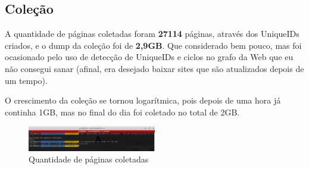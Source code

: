 \subsection{Coleção}

A quantidade de páginas coletadas foram \textbf{27114} páginas, através dos UniqueIDs criados, e o dump da coleção foi de \textbf{2,9GB}. Que considerado bem pouco, mas foi ocasionado pelo uso de detecção de UniqueIDs e ciclos no grafo da Web que eu não consegui sanar (afinal, era desejado baixar sites que são atualizados depois de um tempo).

O crescimento da coleção se tornou logarítmica, pois depois de uma hora já continha 1GB, mas no final do dia foi coletado no total de 2GB.

\begin{figure}[h]
  \includegraphics[width=0.5\textwidth]{images/sizecollected.png}
  \caption{Quantidade de páginas coletadas}
  \label{}
\end{figure}
